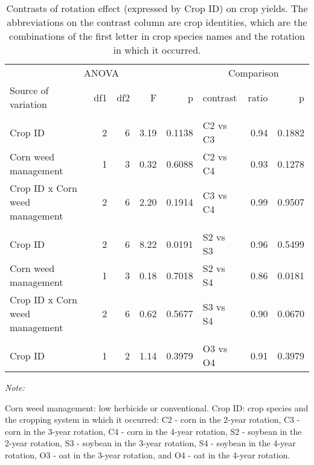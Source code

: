 \documentclass[
]{article}
\begin{document}
\begin{table}[H]

\caption{\label{tab:crop-jt-ct}Contrasts of rotation effect (expressed by Crop ID) on crop yields. The abbreviations on the contrast column are crop identities, which are the combinations of the first letter in crop species names and the rotation in which it occurred.}
\centering
\begin{threeparttable}
\begin{tabular}[t]{lrrr>{}r|lrr}
\toprule
\multicolumn{5}{c}{ANOVA} & \multicolumn{3}{c}{Comparison} \\
\cmidrule(l{3pt}r{3pt}){1-5} \cmidrule(l{3pt}r{3pt}){6-8}
Source of variation & df1 & df2 & F & p & contrast & ratio & p\\
\midrule
\addlinespace[0.3em]
\multicolumn{8}{l}{\textbf{(A) - Corn}}\\
\hspace{1em}Crop ID & 2 & 6 & 3.19 & 0.1138 & C2 vs C3 & 0.94 & 0.1882\\
\hspace{1em}Corn weed management & 1 & 3 & 0.32 & 0.6088 & C2 vs C4 & 0.93 & 0.1278\\
\hspace{1em}Crop ID x Corn weed management & 2 & 6 & 2.20 & 0.1914 & C3 vs C4 & 0.99 & 0.9507\\
\addlinespace[0.3em]
\multicolumn{8}{l}{\textbf{(B) - Soybean}}\\
\hspace{1em}Crop ID & 2 & 6 & 8.22 & 0.0191 & S2 vs S3 & 0.96 & 0.5499\\
\hspace{1em}Corn weed management & 1 & 3 & 0.18 & 0.7018 & S2 vs S4 & 0.86 & 0.0181\\
\hspace{1em}Crop ID x Corn weed management & 2 & 6 & 0.62 & 0.5677 & S3 vs S4 & 0.90 & 0.0670\\
\addlinespace[0.3em]
\multicolumn{8}{l}{\textbf{(C) - Oat}}\\
\hspace{1em}Crop ID & 1 & 2 & 1.14 & 0.3979 & O3 vs O4 & 0.91 & 0.3979\\
\bottomrule
\end{tabular}
\begin{tablenotes}[para]
\item \textit{Note: } 
\item Corn weed management: low herbicide or conventional. Crop ID: crop species and the cropping system in which it occurred: C2 - corn in the 2-year rotation, C3 - corn in the 3-year rotation, C4 - corn in the 4-year rotation, S2 - soybean in the 2-year rotation, S3 - soybean in the 3-year rotation, S4 - soybean in the 4-year rotation, O3 - oat in the 3-year rotation, and O4 - oat in the 4-year rotation.
\end{tablenotes}
\end{threeparttable}
\end{table}
\end{document}
